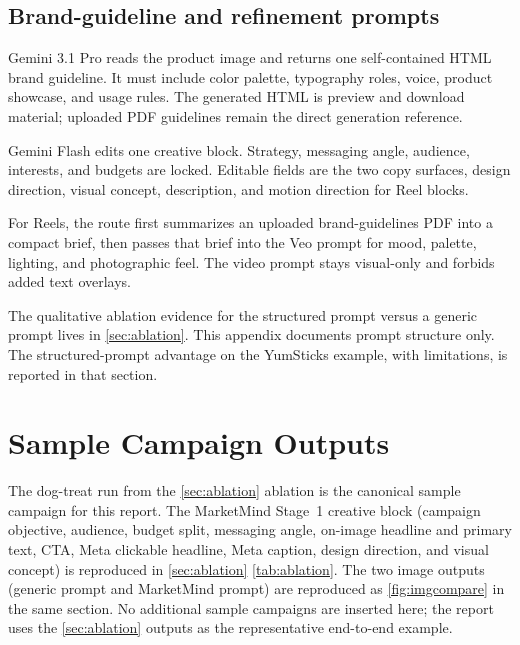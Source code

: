 \documentclass[12pt,a4paper]{report}
\begin{document}
\section{Brand-guideline and refinement prompts}
\label{sec:refineprompt}

\begin{description}[style=nextline, leftmargin=2cm, labelwidth=1.8cm]
  \item[\textsc{brand guideline}] Gemini 3.1 Pro reads the product image and returns one self-contained HTML brand guideline. It must include color palette, typography roles, voice, product showcase, and usage rules. The generated HTML is preview and download material; uploaded PDF guidelines remain the direct generation reference.
  \item[\textsc{per-card refinement}] Gemini Flash edits one creative block. Strategy, messaging angle, audience, interests, and budgets are locked. Editable fields are the two copy surfaces, design direction, visual concept, description, and motion direction for Reel blocks.
  \item[\textsc{video support}] For Reels, the route first summarizes an uploaded brand-guidelines PDF into a compact brief, then passes that brief into the Veo prompt for mood, palette, lighting, and photographic feel. The video prompt stays visual-only and forbids added text overlays.
\end{description}

The qualitative ablation evidence for the structured prompt versus a generic prompt lives in \cref{sec:ablation}. This appendix documents prompt structure only. The structured-prompt advantage on the YumSticks example, with limitations, is reported in that section.


\chapter{Sample Campaign Outputs}
\label{app:sample}

The dog-treat run from the \cref{sec:ablation} ablation is the canonical sample campaign for this report. The MarketMind Stage~1 creative block (campaign objective, audience, budget split, messaging angle, on-image headline and primary text, CTA, Meta clickable headline, Meta caption, design direction, and visual concept) is reproduced in \cref{sec:ablation} \cref{tab:ablation}. The two image outputs (generic prompt and MarketMind prompt) are reproduced as \cref{fig:imgcompare} in the same section. No additional sample campaigns are inserted here; the report uses the \cref{sec:ablation} outputs as the representative end-to-end example.
\end{document}
